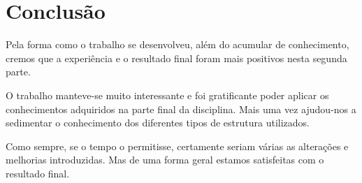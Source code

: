 \documentclass[12pt,a4paper,reqno]{report}
\numberwithin{figure}{section}
\numberwithin{equation}{section}
\begin{document}
\chapter{Conclusão}

Pela forma como o trabalho se desenvolveu, além do acumular de conhecimento, cremos que a experiência e o resultado final foram mais positivos nesta segunda parte.

O trabalho manteve-se muito interessante e foi gratificante poder aplicar os conhecimentos adquiridos na parte final da disciplina. Mais uma vez ajudou-nos a sedimentar o conhecimento dos diferentes tipos de estrutura utilizados.

Como sempre, se o tempo o permitisse, certamente seriam várias as alterações e melhorias introduzidas. Mas de uma forma geral estamos satisfeitas com o resultado final.
\end{document}
